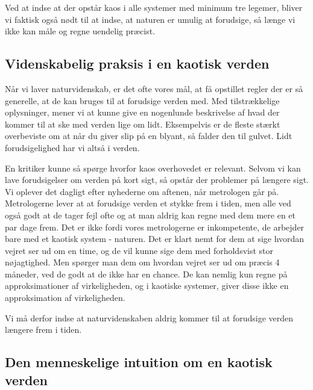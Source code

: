 \documentclass[12pt,a4paper]{article}
\theoremstyle{break}
\theoremstyle{nonumberplain}
\begin{document}
Ved at indse at der opstår kaos i alle systemer med minimum tre legemer, bliver vi faktisk også nødt til at indse, at naturen er umulig at forudsige, så længe vi ikke kan måle og regne uendelig præcist.

\subsection{Videnskabelig praksis i en kaotisk verden}
Når vi laver naturvidenskab, er det ofte vores mål, at få opstillet regler der er så generelle, at de kan bruges til at forudsige verden med. 
Med tilstrækkelige oplysninger, mener vi at kunne give en nogenlunde beskrivelse af hvad der kommer til at ske med verden lige om lidt.
Eksempelvis er de fleste stærkt overbeviste om at når du giver slip på en blyant, så falder den til gulvet. 
Lidt forudsigelighed har vi altså i verden. 

En kritiker kunne så spørge hvorfor kaos overhovedet er relevant. 
Selvom vi kan lave forudsigelser om verden på kort sigt, så opstår der problemer på længere sigt. 
Vi oplever det dagligt efter nyhederne om aftenen, når metrologen går på. 
Metrologerne lever at at forudsige verden et stykke frem i tiden, men alle ved også godt at de tager fejl ofte og at man aldrig kan regne med dem mere en et par dage frem. 
Det er ikke fordi vores metrologerne er inkompetente, de arbejder bare med et kaotisk system - naturen.
Det er klart nemt for dem at sige hvordan vejret ser ud om en time, og de vil kunne sige dem med forholdsvist stor nøjagtighed.
Men spørger man dem om hvordan vejret ser ud om præcis 4 måneder, ved de godt at de ikke har en chance. 
De kan nemlig kun regne på approksimationer af virkeligheden, og i kaotiske systemer, giver disse ikke en approksimation af virkeligheden.

Vi må derfor indse at naturvidenskaben aldrig kommer til at forudsige verden længere frem i tiden. 

\subsection{Den menneskelige intuition om en kaotisk verden}
\end{document}
